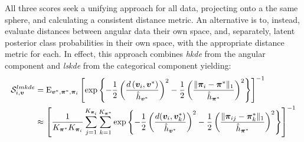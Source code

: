 All three scores seek a unifying approach for all data, projecting onto a the same 
    sphere, and calculating a 
    consistent distance metric.  An alternative is to, instead, evaluate distances 
    between angular data their own space, and, separately, latent posterior class 
    probabilities in their own space, with the appropriate distance metric for 
    each.  In effect, this approach combines \emph{hkde} from
    the angular component and \emph{lskde} from the categorical component yielding:
    \begin{equation}
    \label{eqn:lmkdecat}
    \begin{aligned}
    \mathcal{S}_{i,\bm{v}}^{lmkde} &= \text{E}_{\bm{v}^*,\bm{\pi}^*,\bm{\pi}_i}\left[
        \exp
        \left\lbrace 
        -\frac{1}{2}
        \left(
        \frac{d\left(\bm{v}_i, \bm{v}^*\right)}{\hat{h}_{\bm{v}^*}}
        \right)^2
        -\frac{1}{2}
        \left(
        \frac{\lVert\bm{\pi}_i - \bm{\pi}^*\rVert_1}{\hat{h}_{\bm{\pi}^*}}
        \right)^2
        \right\rbrace
        \right]^{-1}\\
        &\approx \left[\frac{1}{K_{\bm{\pi}^*}K_{\bm{\pi}_i}}
            \sum_{j = 1}^{K_{\bm{\pi}_i}}\sum_{k=1}^{K_{\bm{\pi}^*}}
            \exp\left\lbrace-\frac{1}{2}
            \left(\frac{d(\bm{v}_i,\bm{v}_k^*)}{\hat{h}_{\bm{v}^*}}\right)^2
            -\frac{1}{2}\left(
            \frac{\lVert\bm{\pi}_{ij} - \bm{\pi}_k^*\rVert_1}{\hat{h}_{\bm{\pi}^*}}
            \right)^2
            \right\rbrace\right]^{-1}
    \end{aligned}
    \end{equation}
